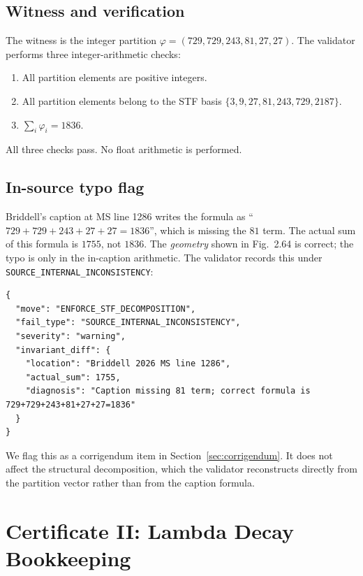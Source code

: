 \documentclass[12pt,a4paper]{article}
\begin{document}
\subsection{Witness and verification}

The witness is the integer partition $\varphi = (729, 729, 243, 81, 27, 27)$.
The validator performs three integer-arithmetic checks:
\begin{enumerate}[nosep]
  \item All partition elements are positive integers.
  \item All partition elements belong to the STF basis
        $\{3, 9, 27, 81, 243, 729, 2187\}$.
  \item $\sum_i \varphi_i = 1836$.
\end{enumerate}
All three checks pass. No float arithmetic is performed.

\subsection{In-source typo flag}

Briddell's caption at MS line 1286 writes the formula as
``$729 + 729 + 243 + 27 + 27 = 1836$'', which is missing the
$81$ term. The actual sum of this formula is $1755$, not $1836$.
The \emph{geometry} shown in Fig.~2.64 is correct; the typo is
only in the in-caption arithmetic. The validator records this
under \texttt{SOURCE\_INTERNAL\_INCONSISTENCY}:

\begin{lstlisting}
{
  "move": "ENFORCE_STF_DECOMPOSITION",
  "fail_type": "SOURCE_INTERNAL_INCONSISTENCY",
  "severity": "warning",
  "invariant_diff": {
    "location": "Briddell 2026 MS line 1286",
    "actual_sum": 1755,
    "diagnosis": "Caption missing 81 term; correct formula is 729+729+243+81+27+27=1836"
  }
}
\end{lstlisting}

We flag this as a corrigendum item in Section~\ref{sec:corrigendum}.
It does not affect the structural decomposition, which the validator
reconstructs directly from the partition vector rather than from the
caption formula.


\section{Certificate II: Lambda Decay Bookkeeping}
\label{sec:cert2}
\end{document}

